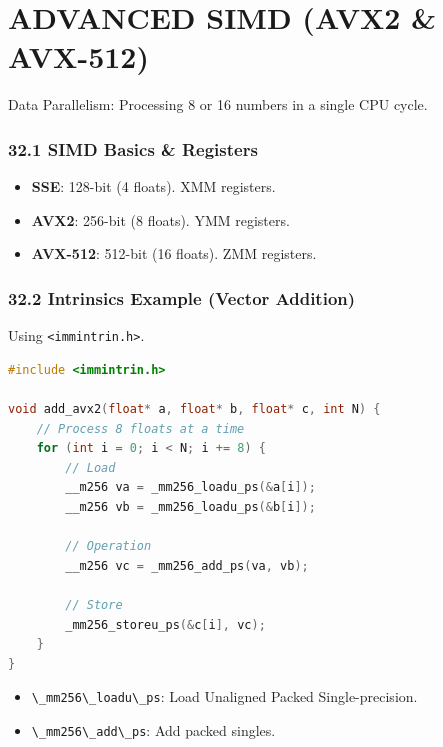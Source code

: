 \hypertarget{advanced-simd-avx2-avx-512}{%
\chapter{ADVANCED SIMD (AVX2 \&
AVX-512)}\label{advanced-simd-avx2-avx-512}}

Data Parallelism: Processing 8 or 16 numbers in a single CPU cycle.

\hypertarget{simd-basics-registers}{%
\subsection{32.1 SIMD Basics \& Registers}\label{simd-basics-registers}}

\begin{itemize}
\tightlist
\item
  \textbf{SSE}: 128-bit (4 floats). XMM registers.
\item
  \textbf{AVX2}: 256-bit (8 floats). YMM registers.
\item
  \textbf{AVX-512}: 512-bit (16 floats). ZMM registers.
\end{itemize}

\hypertarget{intrinsics-example-vector-addition}{%
\subsection{32.2 Intrinsics Example (Vector
Addition)}\label{intrinsics-example-vector-addition}}

Using \passthrough{\lstinline!<immintrin.h>!}.

\begin{lstlisting}[language={C++}]
#include <immintrin.h>

void add_avx2(float* a, float* b, float* c, int N) {
    // Process 8 floats at a time
    for (int i = 0; i < N; i += 8) {
        // Load
        __m256 va = _mm256_loadu_ps(&a[i]);
        __m256 vb = _mm256_loadu_ps(&b[i]);
        
        // Operation
        __m256 vc = _mm256_add_ps(va, vb);
        
        // Store
        _mm256_storeu_ps(&c[i], vc);
    }
}
\end{lstlisting}

\begin{itemize}
\tightlist
\item
  \passthrough{\lstinline!\_mm256\_loadu\_ps!}: Load Unaligned Packed
  Single-precision.
\item
  \passthrough{\lstinline!\_mm256\_add\_ps!}: Add packed singles.
\end{itemize}

